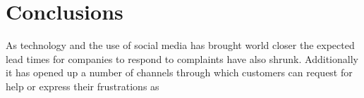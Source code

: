 \chapter{Conclusions}

As technology and the use of social media has brought world closer the expected lead times for companies to respond to complaints have also shrunk. Additionally it has opened up a number of channels through which customers can request for help or express their frustrations as
